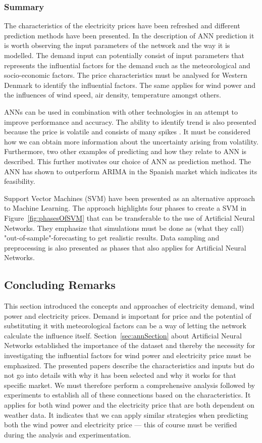 \subsubsection{Summary}
The characteristics of the electricity prices have been refreshed and different prediction methods have been presented. In the description of ANN prediction it is worth observing the input parameters of the network and the way it is modelled. The demand input can potentially consist of input parameters that represents the influential factors for the demand such as the meteorological and socio-economic factors. The price characteristics must be analysed for Western Denmark to identify the influential factors. The same applies for wind power and the influences of wind speed, air density, temperature amongst others.

ANNs can be used in combination with other technologies in an attempt to improve performance and accuracy. The ability to identify trend is also presented because the price is volatile and consists of many spikes \cite{singhal2011electricity}. It must be considered how we can obtain more information about the uncertainty arising from volatility. Furthermore, two other examples of predicting and how they relate to ANN is described. This further motivates our choice of ANN as prediction method. The ANN has shown to outperform ARIMA in the Spanish market which indicates its feasibility. 

Support Vector Machines (SVM) have been presented as an alternative approach to Machine Learning. The approach highlights four phases to create a SVM in Figure~\ref{fig:phasesOfSVM} that can be transferable to the use of Artificial Neural Networks. They emphasize that simulations must be done as (what they call) "out-of-sample"-forecasting to get realistic results. Data sampling and preprocessing is also presented as phases that also applies for Artificial Neural Networks.   

\subsection{Concluding Remarks}
This section introduced the concepts and approaches of electricity demand, wind power and electricity prices. Demand is important for price and the potential of substituting it with meteorological factors can be a way of letting the network calculate the influence itself. Section~\ref{sec:annSection} about Artificial Neural Networks established the importance of the dataset and thereby the necessity for investigating the influential factors for wind power and electricity price must be emphasized. The presented papers describe the characteristics and inputs but do not go into details with why it has been selected and why it works for that specific market. We must therefore perform a comprehensive analysis followed by experiments to establish all of these connections based on the characteristics. It applies for both wind power and the electricity price that are both dependent on weather data. It indicates that we can apply similar strategies when predicting both the wind power and electricity price --- this of course must be verified during the analysis and experimentation.
